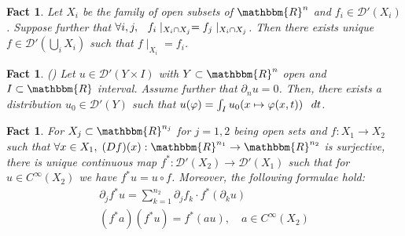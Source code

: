\documentclass{article}
\newtheorem{fact}[proposition]{Fact}
\theoremstyle{remark}
\newcommand{\D}{\mathcal{D}}
\newcommand{\proofexplanation}[1]{(#1)}
\newcommand{\R}{\mathbbm{R}}
\begin{document}
\begin{fact}
\label{fact:localization}{\cite[Thm 2.2.4]{hormander1983analysis}}
Let $X_i$ be the family of open subsets of $\R^n$ and $f_i \in \D' (X_i)$.
Suppose further that $\forall i, j, \hspace{0.75em} f_i \mid_{X_i \cap
X_j} = f_j \mid_{X_i \cap X_j}$. Then there exists unique $f \in \D'
(\bigcup_i X_i)$ such that $f \mid_{X_i} =
f_i$.
\end{fact}

\begin{fact}
{\proofexplanation{{\cite[Thm. 3.1.4']{hormander1983analysis}}}}
\label{fact:sing-q-4}Let $u \in \D' (Y \times I)$ with $Y \subset \R^n$ open
and $I \subset \R$ interval. Assume further that $\partial_n u = 0$. Then,
there exists a distribution $u_0 \in \D' (Y)$ such that $u (\varphi) = \int_I
u_0  (x \mapsto \varphi (x, t))  \hspace{0.75em}
dt$.
\end{fact}

\begin{fact}
\label{lem67:fact-pullback}{\cite[thm.
6.1.2]{hormander1983analysis}} For $X_j \subset \mathbbm{R}^{n_j}$ for $j = 1,
2$ being open sets and $f : X_1 \rightarrow X_2$ such that $\forall x \in X_1,
\; (D f) (x) : \mathbbm{R}^{n_1} \rightarrow \mathbbm{R}^{n_2}$ is surjective,
there is unique continuous map $f^{\ast} : \mathcal{D}' (X_2) \rightarrow
\mathcal{D}' (X_1)$ such that for $u \in C^{\infty} (X_2)$ we have $f^{\ast} u
= u \circ f$. Moreover, the following formulae hold:
\begin{eqnarray}
  & \partial_j f^{\ast} u = \sum_{k = 1}^{n_2} \partial_j f_k \cdot f^{\ast}
  (\partial_k u) &  \nonumber\\
  & (f^{\ast} a) (f^{\ast} u) = f^{\ast} (a u), \quad a \in C^{\infty} (X_2)
  &  \nonumber
\end{eqnarray}
\end{fact}
\end{document}
